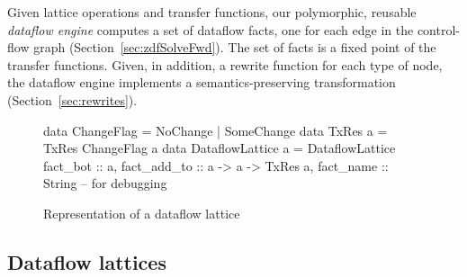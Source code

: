 \documentclass[blockstyle,preprint,nocopyrightspace]{sigplanconf}
\newcommand\secref[1]{Section~\ref{sec:#1}}
\newcommand\figlabel[1]{\label{fig:#1}}
\begin{document}
Given lattice operations and transfer functions, our
polymorphic, reusable \emph{dataflow engine} computes a
set of dataflow facts, one for each edge in the control-flow graph 
(\secref{zdfSolveFwd}).
The set of facts is a fixed point of the transfer functions.
Given, in addition, a rewrite function for each type of node,
the dataflow engine implements a semantics-preserving transformation
(\secref{rewrites}). 

\begin{figure}
\begin{code}
data ChangeFlag = NoChange | SomeChange
data TxRes a    = TxRes ChangeFlag a
data DataflowLattice a = DataflowLattice
 {fact_bot        :: a,
  fact_add_to     :: a -> a -> TxRes a,
  fact_name       :: String } -- for debugging
\end{code}
\caption{Representation of a dataflow lattice} \figlabel{lattice-type} \figlabel{lattice}
\end{figure}


\subsection{Dataflow lattices}
\end{document}
